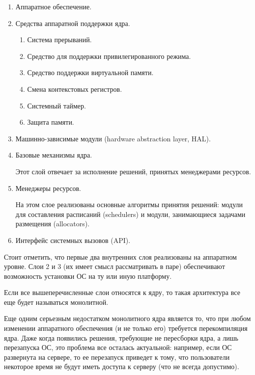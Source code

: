 \begin{enumerate}
\item
  Аппаратное обеспечение.  

\item
  Средства аппаратной поддержки ядра.
  
  \begin{enumerate}
  \item
    Система прерываний.

  \item
    Средство для поддержки привилегированного режима.

  \item
    Средство поддержки виртуальной памяти.

  \item
    Смена контекстовых регистров.

  \item
    Системный таймер.

  \item
    Защита памяти.
  \end{enumerate}

\item
  Машинно-зависимые модули (hardware abstraction layer, HAL).

\item
  Базовые механизмы ядра.

  Этот слой отвечает за исполнение решений, принятых менеджерами ресурсов.

\item
  Менеджеры ресурсов.

  На этом слое реализованы основные алгоритмы принятия решений: модули для
  составления расписаний (schedulers) и модули, занимающиеся задачами размещения
  (allocators).

\item
  Интерфейс системных вызовов (API).
\end{enumerate}

Стоит отметить, что первые два внутренних слоя реализованы на аппаратном уровне.
Слои 2 и 3 (их имеет смысл рассматривать в паре) обеспечивают возможность
установки ОС на ту или иную платформу.

\begin{remark}
  Если все вышеперечисленные слои относятся к ядру, то такая архитектура все еще
  будет называться монолитной.
\end{remark}

Еще одним серьезным недостатком монолитного ядра является то, что при любом
изменении аппаратного обеспечения (и не только его) требуется перекомпиляция
ядра. Даже когда появились решения, требующие не пересборки ядра, а лишь
перезапуска ОС, это проблема все осталась актуальной: например, если ОС
развернута на сервере, то ее перезапуск приведет к тому, что пользователи
некоторое время не будут иметь доступа к серверу (что не всегда допустимо).

